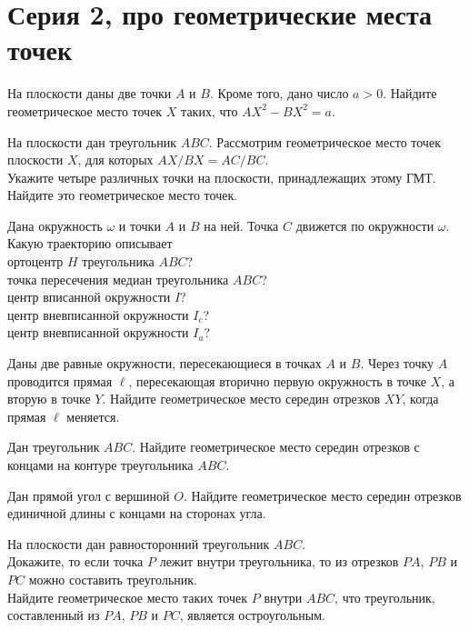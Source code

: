 

\section*{Серия 2, про геометрические места точек}


\begin{problems}

\item
На плоскости даны две точки $A$ и $B$.
Кроме того, дано число $a > 0$.
Найдите геометрическое место точек $X$ таких, что $AX^2 - BX^2 = a$.

\item
На плоскости дан треугольник $ABC$.
Рассмотрим геометрическое место точек плоскости $X$, для которых
$AX / BX = AC / BC$.
\\
\sbp
Укажите четыре различных точки на плоскости, принадлежащих этому ГМТ.
\\
\sbp
Найдите это геометрическое место точек.

\item
Дана окружность $\omega$ и точки $A$ и $B$ на ней.
Точка $C$ движется по окружности $\omega$.
Какую траекторию описывает
\\
\sbp
ортоцентр $H$ треугольника $ABC$?
\\
\sbp
точка пересечения медиан треугольника $ABC$?
\\
\sbp центр вписанной окружности $I$?
\\
\sbp центр вневписанной окружности $I_c$?
\\
\sbp центр вневписанной окружности $I_a$?

\item
Даны две равные окружности, пересекающиеся в точках $A$ и $B$.
Через точку $A$ проводится прямая $\ell$, пересекающая вторично первую
окружность в точке $X$, а вторую в точке $Y$.
Найдите геометрическое место середин отрезков $XY$, когда прямая $\ell$
меняется.

\item
Дан треугольник $ABC$.
Найдите геометрическое место середин отрезков с концами на контуре треугольника
$ABC$.

\item
Дан прямой угол с вершиной $O$.
Найдите геометрическое место середин отрезков единичной длины с концами на
сторонах угла.

\item
На плоскости дан равносторонний треугольник $ABC$.
\\
\sbp
Докажите, то если точка $P$ лежит внутри треугольника, то из отрезков
$PA$, $PB$ и $PC$ можно составить треугольник.
\\
\sbp
Найдите геометрическое место таких точек $P$ внутри $ABC$, что треугольник,
составленный из $PA$, $PB$ и $PC$, является остроугольным.

\end{problems}

